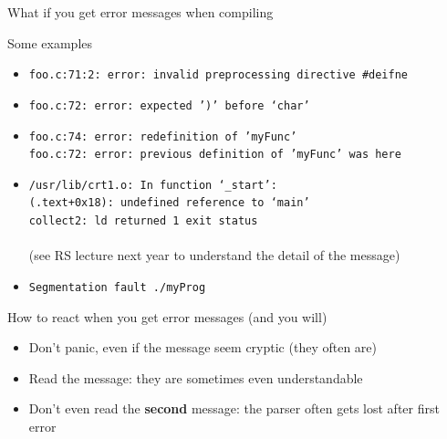 \begin{frame}[squeeze]{What if you get error messages when compiling}
  \vspace{-.3\baselineskip}
  \begin{block}{Some examples}
    \begin{itemize}\vspace{-.3\baselineskip}
    \item \texttt{\small foo.c:71:2: error: invalid preprocessing directive
        \#deifne}\\
      
    \item \texttt{\small foo.c:72: error: expected ')' before `char'}\\
    \item \texttt{\small foo.c:74: error: redefinition of 'myFunc'\\
        foo.c:72: error: previous definition of 'myFunc' was here}\\
    \item \texttt{/usr/lib/crt1.o: In function `\_start':\\
        (.text+0x18): undefined reference to `main'\\
        collect2: ld returned 1 exit status}\\
       \\
      {\small(see RS lecture next year to understand the detail of the message)}
    \item \texttt{Segmentation fault ./myProg}\\
    \end{itemize}
  \end{block}\vspace{-.8\baselineskip}

  \begin{block}{How to react when you get error messages (and you will)}
    \begin{itemize}\vspace{-.3\baselineskip}
    \item \alert{Don't panic}, even if the message seem cryptic (they often are)
    \item \alert{Read the message:} they are sometimes even understandable
    \item \alert{Don't even read the \textbf{second} message:} the parser often
      gets lost after first error
    \end{itemize}
  \end{block}
\end{frame}
